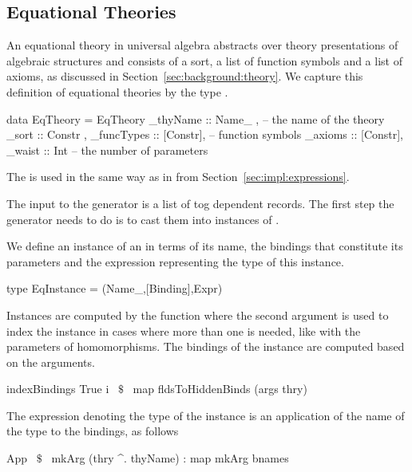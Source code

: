 \subsection{Equational Theories}
\label{subsec:generation:eqTheories}
An equational theory in universal algebra abstracts over theory presentations of algebraic structures and consists of a sort, a list of function symbols and a list of axioms, as discussed in Section~\ref{sec:background:theory}. We capture this definition of equational theories by the type . 
\begin{hscode}
data EqTheory = EqTheory {
  _thyName    :: Name_  ,   -- the name of the theory 
  _sort       :: Constr ,      
  _funcTypes  :: [Constr], -- function symbols 
  _axioms     :: [Constr],
  _waist      :: Int }     -- the number of parameters 
\end{hscode}
The  is used in the same way as in  from Section~\ref{sec:impl:expressions}. 

The input to the generator is a list of tog dependent records. The first step the generator needs to do is to cast them into instances of . 
\begin{comment}
This is done using the function \lstmath{recordToEqTheory}. 
\begin{hscode}
recordToEqTheory :: TRecord -> Eq.EqTheory
recordToEqTheory record@(TRecord nm params _) =
  Eq.build (nm^.name) 
    (getRecordSort record)
    (getRecordComps isFunc record)
    (getRecordComps isAxiom record)
    (paramsNum params)
\end{hscode}
In tog, records definitions are declared using the \lstmath{Record} constructor of the type \lstmath{Decl}, which contains many other constructors used to define functions, types, and others. We prefer to use a type dedicated to records, and therefore use the \lstmath{TRecord} type instead. \lstmath{TRecord} has the exact same parameters as the \lstmath{Record} constructor. 
\end{comment}

We define an instance of an  in terms of its name, the bindings that constitute its parameters and the expression representing the type of this instance. 
\begin{hscode}
 type EqInstance = (Name_,[Binding],Expr) 
\end{hscode}
Instances are computed by the function 
where the second argument is used to index the instance in cases where more than one is needed, like with the parameters of homomorphisms. The bindings of the instance are computed based on the arguments. 
\begin{hscode}
 indexBindings True i ~$\$$~ map fldsToHiddenBinds (args thry)
\end{hscode}
The expression denoting the type of the instance is an application of the name of the type to the bindings, as follows 
\begin{hscode}
App ~$\$$~ mkArg (thry ^. thyName) : map mkArg bnames
\end{hscode} 

